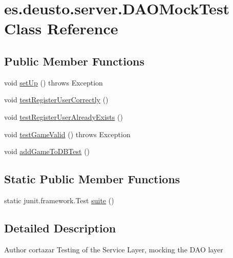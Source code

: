 \hypertarget{classes_1_1deusto_1_1server_1_1_d_a_o_mock_test}{}\section{es.\+deusto.\+server.\+D\+A\+O\+Mock\+Test Class Reference}
\label{classes_1_1deusto_1_1server_1_1_d_a_o_mock_test}
\subsection*{Public Member Functions}
\begin{DoxyCompactItemize}
\item 
void \hyperlink{classes_1_1deusto_1_1server_1_1_d_a_o_mock_test_aa5b5750c57bea368660f61349b5a1b44}{set\+Up} ()  throws Exception 
\item 
void \hyperlink{classes_1_1deusto_1_1server_1_1_d_a_o_mock_test_a130e22cffc04eaf64f676f3bd990842e}{test\+Register\+User\+Correctly} ()
\item 
void \hyperlink{classes_1_1deusto_1_1server_1_1_d_a_o_mock_test_ad1bc82a076c6efbe4119405df120e9f7}{test\+Register\+User\+Already\+Exists} ()
\item 
void \hyperlink{classes_1_1deusto_1_1server_1_1_d_a_o_mock_test_a54ba8b12cdb1c6e74fdabb8f6341ced5}{test\+Game\+Valid} ()  throws Exception 
\item 
void \hyperlink{classes_1_1deusto_1_1server_1_1_d_a_o_mock_test_ac45454ef9188b6cf832e5180b3263617}{add\+Game\+To\+D\+B\+Test} ()
\end{DoxyCompactItemize}
\subsection*{Static Public Member Functions}
\begin{DoxyCompactItemize}
\item 
static junit.\+framework.\+Test \hyperlink{classes_1_1deusto_1_1server_1_1_d_a_o_mock_test_a22f78cde67ca8ab6f7b09ce4b946495c}{suite} ()
\end{DoxyCompactItemize}


\subsection{Detailed Description}
\begin{DoxyAuthor}{Author}
cortazar Testing of the Service Layer, mocking the D\+AO layer 
\end{DoxyAuthor}


